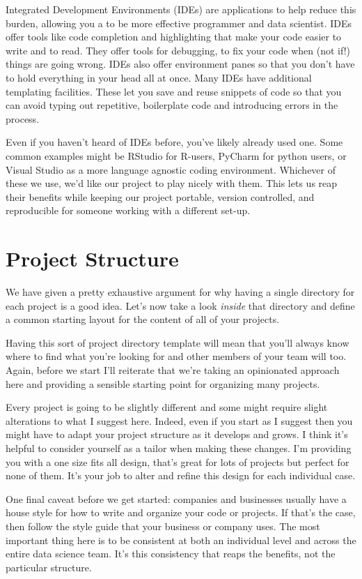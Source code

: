 \documentclass[
  letterpaper,
  DIV=11,
  numbers=noendperiod]{scrreprt}
\begin{document}
Integrated Development Environments (IDEs) are applications to help
reduce this burden, allowing you a to be more effective programmer and
data scientist. IDEs offer tools like code completion and highlighting
that make your code easier to write and to read. They offer tools for
debugging, to fix your code when (not if!) things are going wrong. IDEs
also offer environment panes so that you don't have to hold everything
in your head all at once. Many IDEs have additional templating
facilities. These let you save and reuse snippets of code so that you
can avoid typing out repetitive, boilerplate code and introducing errors
in the process.

Even if you haven't heard of IDEs before, you've likely already used
one. Some common examples might be RStudio for R-users, PyCharm for
python users, or Visual Studio as a more language agnostic coding
environment. Whichever of these we use, we'd like our project to play
nicely with them. This lets us reap their benefits while keeping our
project portable, version controlled, and reproducible for someone
working with a different set-up.

\section{Project Structure}\label{project-structure}

We have given a pretty exhaustive argument for why having a single
directory for each project is a good idea. Let's now take a look
\emph{inside} that directory and define a common starting layout for the
content of all of your projects.

Having this sort of project directory template will mean that you'll
always know where to find what you're looking for and other members of
your team will too. Again, before we start I'll reiterate that we're
taking an opinionated approach here and providing a sensible starting
point for organizing many projects.

Every project is going to be slightly different and some might require
slight alterations to what I suggest here. Indeed, even if you start as
I suggest then you might have to adapt your project structure as it
develops and grows. I think it's helpful to consider yourself as a
tailor when making these changes. I'm providing you with a one size fits
all design, that's great for lots of projects but perfect for none of
them. It's your job to alter and refine this design for each individual
case.

One final caveat before we get started: companies and businesses usually
have a house style for how to write and organize your code or projects.
If that's the case, then follow the style guide that your business or
company uses. The most important thing here is to be consistent at both
an individual level and across the entire data science team. It's this
consistency that reaps the benefits, not the particular structure.
\end{document}

